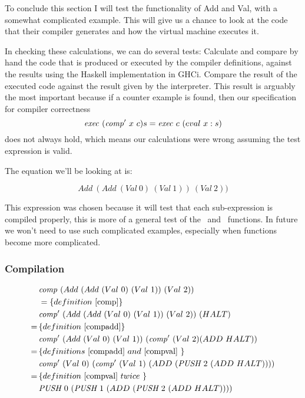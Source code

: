 \documentclass {article}
\begin{document}
To conclude this section I will test the functionality
of Add and Val, with a somewhat complicated
example.
This will give us a chance to look at the code that their
compiler generates and how the virtual machine executes it.

In checking these calculations, we can do several tests:
Calculate and compare by hand 
the code that is produced or executed
by the compiler definitions, 
against the results using the Haskell implementation in GHCi.
Compare the result of the executed code against the result
given by the interpreter. 
This result is arguably the most
important because if a counter example is found,
then our specification for compiler correctness 
\[ \Exec (\Compp  x\ c) s = \Exec c\ (eval\ x : s) \]
does not always hold, 
which means our calculations were wrong
assuming the test expression is valid.


The equation we'll be looking at is:

\[ Add\ (Add\ (Val\ 0)\ (Val\ 1))\ (Val\ 2)) \]

This expression was chosen because it 
will test that each sub-expression
is compiled properly, 
this is more of a general test of the
\comp\ and \compp\ functions. 
In future we won't need to use
such complicated examples, 
especially when functions become more complicated.

\subsubsection{Compilation}

\begin{align*}
&\Comp (Add\ (Add\ (Val\ 0)\ (Val\ 1))\ (Val\ 2)) \\
&= \{ definition\ \ref{comp} \} \\
&\Compp  (Add\ (Add\ (Val\ 0)\ (Val\ 1))\ (Val\ 2))\ 			(HALT) \\
=\, & \{ definition\ \ref{compadd} \} \\
&\Compp  (Add\ (Val\ 0)\ (Val\ 1))\ (\Compp  (Val\ 2) 	  (ADD\ HALT)) \\
=\, & \{ definitions\ \ref{compadd}\ and\ \ref{compval}\ \} \\
&\Compp  (Val\ 0)\ (\Compp  (Val\ 1)\		(ADD\ (\PUSH 2\ (ADD\ HALT)))) \\
=\, & \{ definition\ \ref{compval}\ twice\ \} \\
&					 \PUSH 0\ (\PUSH 1\ (ADD\ (\PUSH 2\ (ADD\ HALT)))) \\
\end{align*}
\end{document}
